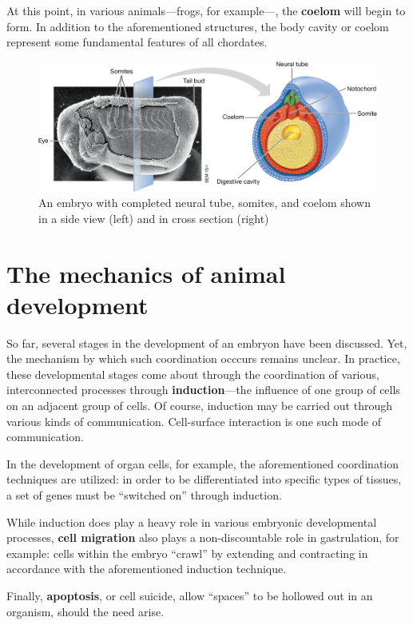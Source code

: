\documentclass{article}
\begin{document}
At this point, in various animals---frogs, for example---, the \textbf{coelom}
will begin to form. In addition to the aforementioned structures, the body
cavity or coelom represent some fundamental features of all chordates.

\bigbreak

\begin{figure}[h]
	\centering
	\includegraphics[width=.8\linewidth]{embryo_cross_section_neural_tube.png}
	\caption{An embryo with completed neural tube, somites, and coelom shown in a side view (left) and in cross section (right)}
\end{figure}

\section{The mechanics of animal development}

So far, several stages in the development of an embryon have been discussed.
Yet, the mechanism by which such coordination occcurs remains unclear. In
practice, these developmental stages come about through the coordination of
various, interconnected processes through \textbf{induction}---the influence
of one group of cells on an adjacent group of cells. Of course, induction may
be carried out through various kinds of communication. Cell-surface interaction
is one such mode of communication.

In the development of organ cells, for example, the aforementioned coordination
techniques are utilized: in order to be differentiated into specific types of
tissues, a set of genes must be ``switched on'' through induction.

While induction does play a heavy role in various embryonic developmental processes,
\textbf{cell migration} also plays a non-discountable role in gastrulation, for
example: cells within the embryo ``crawl'' by extending and contracting in accordance
with the aforementioned induction technique.

Finally, \textbf{apoptosis}, or cell suicide, allow ``spaces'' to be hollowed
out in an organism, should the need arise.
\end{document}
